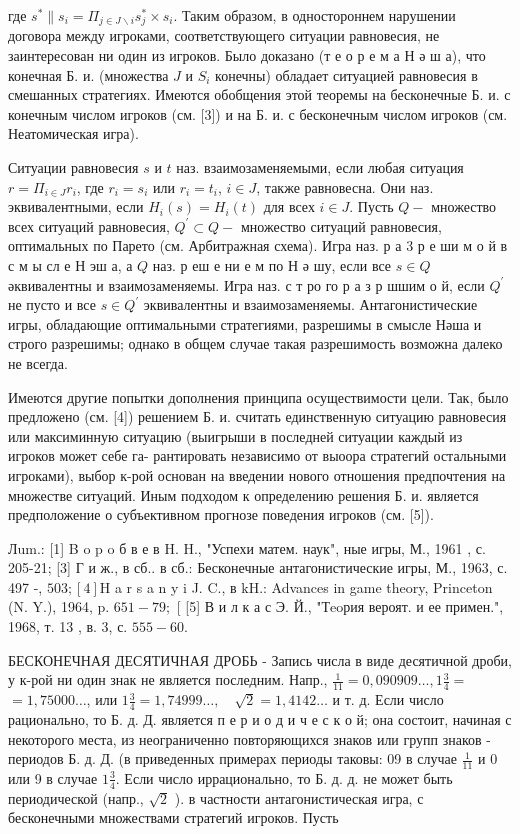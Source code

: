 \documentclass[10pt]{article}
\begin{document}
где $s^{*} \| s_{i}=\Pi_{j \in J \backslash i} s_{j}^{*} \times s_{i}$. Таким образом, в одностороннем нарушении договора между игроками, соответствующего ситуации равновесия, не заинтересован ни один из игроков. Было доказано (т е о р е м а Н ә ш а), что конечная Б. и. (множества $J$ и $S_{i}$ конечны) обладает ситуацией равновесия в смешанных стратегиях. Имеются обобщения этой теоремы на бесконечные Б. и. с конечным числом игроков (см. [3]) и на Б. и. с бесконечным числом игроков (см. Неатомическая игра).



Ситуации равновесия $s$ и $t$ наз. взаимозаменяемыми, если любая ситуация $r=\Pi_{i \in J} r_{i}$, где $r_{i}=s_{i}$ или $r_{i}=t_{i}$, $i \in J$, также равновесна. Они наз. эквивалентными, если $H_{i}(s)=H_{i}(t)$ для всех $i \in J$. Пусть $Q-$ множество всех ситуаций равновесия, $Q^{\prime} \subset Q-$ множество ситуаций равновесия, оптимальных по Парето (см. Арбитражная схема). Игра наз. р а 3 р е ши м о й в с м ы сл е Н эш а, а $Q$ наз. р еш е ни е м по Н ә шу, если все $s \in Q$ әквивалентны и взаимозаменяемы. Игра наз. с т ро го р а з р шшим о й, если $Q^{\prime}$ не пусто и все $s \in Q^{\prime}$ эквивалентны и взаимозаменяемы. Антагонистические игры, обладающие оптимальными стратегиями, разрешимы в смысле Нәша и строго разрешимы; однако в общем случае такая разрешимость возможна далеко не всегда.



Имеются другие попытки дополнения принципа осуществимости цели. Так, было предложено (см. [4]) решением Б. и. считать единственную ситуацию равновесия или максиминную ситуацию (выигрыши в последней ситуации каждый из игроков может себе га- рантировать независимо от выоора стратегий остальными игроками), выбор к-рой основан на введении нового отношения предпочтения на множестве ситуаций. Иным подходом к определению решения Б. и. является предположение о субъективном прогнозе поведения игроков (см. [5]).



Лum.: [1] B o p o б в е в H. H., "Успехи матем. наук", ные игры, М., 1961 , с. 205-21; [3] Г и ж., в сб.. в сб.: Бесконечные антагонистические игры, М., 1963, с. 497 -, $503 ;[4] \mathrm{H}$ a r s a n y i J. C., в $\mathrm{kH}$.: Advances in game theory, Princeton (N. Y.), 1964, p. $651-79 ;$ [ [5] В и л к а с Э. Й., "Тeoрия вероят. и ее примен.", 1968, т. 13 , в. 3, с. $555-60$.



БЕСКОНЕЧНАЯ ДЕСЯТИЧНАЯ ДРОБЬ - Запись числа в виде десятичной дроби, у к-рой ни один знак не является последним. Напр., $\frac{1}{11}=0,090909 \ldots, 1 \frac{3}{4}=$ $=1,75000 \ldots$, или $1 \frac{3}{4}=1,74999 \ldots, \quad \sqrt{2}=1,4142 \ldots$ и т. д. Если число рационально, то Б. д. Д. является п е р и о д и ч е с к о й; она состоит, начиная с некоторого места, из неограниченно повторяющихся знаков или групп знаков - периодов Б. д. Д. (в приведенных примерах периоды таковы: 09 в случае $\frac{1}{11}$ и 0 или 9 в случае $1 \frac{3}{4}$. Если число иррационально, то Б. д. д. не может быть периодической (напр., $\sqrt{2}$ ). в частности антагонистическая игра, с бесконечными множествами стратегий игроков. Пусть
\end{document}
